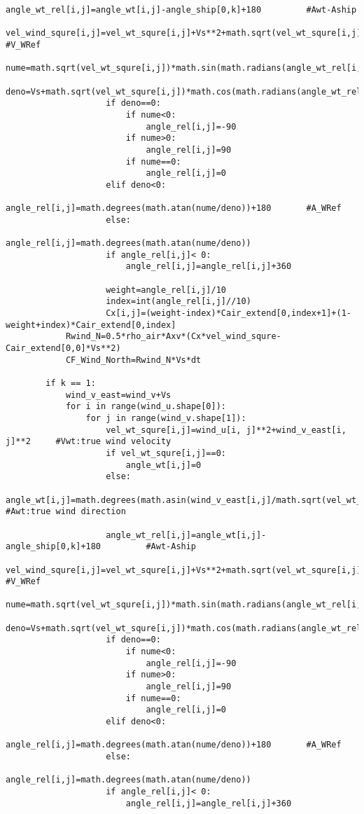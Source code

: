 \begin{lstlisting}[caption=Testing codes (\autoref{TestResults}), label=TestCodes]
                    angle_wt_rel[i,j]=angle_wt[i,j]-angle_ship[0,k]+180         #Awt-Aship
                    vel_wind_squre[i,j]=vel_wt_squre[i,j]+Vs**2+math.sqrt(vel_wt_squre[i,j])*Vs*math.cos(math.radians(angle_wt_rel[i,j])) #V_WRef
                    nume=math.sqrt(vel_wt_squre[i,j])*math.sin(math.radians(angle_wt_rel[i,j]))
                    deno=Vs+math.sqrt(vel_wt_squre[i,j])*math.cos(math.radians(angle_wt_rel[i,j]))
                    if deno==0:
                        if nume<0:
                            angle_rel[i,j]=-90
                        if nume>0:
                            angle_rel[i,j]=90
                        if nume==0:
                            angle_rel[i,j]=0
                    elif deno<0:
                        angle_rel[i,j]=math.degrees(math.atan(nume/deno))+180       #A_WRef
                    else:
                        angle_rel[i,j]=math.degrees(math.atan(nume/deno))
                    if angle_rel[i,j]< 0:
                        angle_rel[i,j]=angle_rel[i,j]+360
                    
                    weight=angle_rel[i,j]/10
                    index=int(angle_rel[i,j]//10)
                    Cx[i,j]=(weight-index)*Cair_extend[0,index+1]+(1-weight+index)*Cair_extend[0,index]
            Rwind_N=0.5*rho_air*Axv*(Cx*vel_wind_squre-Cair_extend[0,0]*Vs**2)
            CF_Wind_North=Rwind_N*Vs*dt

        if k == 1:
            wind_v_east=wind_v+Vs
            for i in range(wind_u.shape[0]):
                for j in range(wind_v.shape[1]):
                    vel_wt_squre[i,j]=wind_u[i, j]**2+wind_v_east[i, j]**2     #Vwt:true wind velocity
                    if vel_wt_squre[i,j]==0:
                        angle_wt[i,j]=0
                    else:
                        angle_wt[i,j]=math.degrees(math.asin(wind_v_east[i,j]/math.sqrt(vel_wt_squre[i,j]))) #Awt:true wind direction
                    
                    angle_wt_rel[i,j]=angle_wt[i,j]-angle_ship[0,k]+180         #Awt-Aship
                    vel_wind_squre[i,j]=vel_wt_squre[i,j]+Vs**2+math.sqrt(vel_wt_squre[i,j])*Vs*math.cos(math.radians(angle_wt_rel[i,j])) #V_WRef
                    nume=math.sqrt(vel_wt_squre[i,j])*math.sin(math.radians(angle_wt_rel[i,j]))
                    deno=Vs+math.sqrt(vel_wt_squre[i,j])*math.cos(math.radians(angle_wt_rel[i,j]))
                    if deno==0:
                        if nume<0:
                            angle_rel[i,j]=-90
                        if nume>0:
                            angle_rel[i,j]=90
                        if nume==0:
                            angle_rel[i,j]=0
                    elif deno<0:
                        angle_rel[i,j]=math.degrees(math.atan(nume/deno))+180       #A_WRef
                    else:
                        angle_rel[i,j]=math.degrees(math.atan(nume/deno))
                    if angle_rel[i,j]< 0:
                        angle_rel[i,j]=angle_rel[i,j]+360
                    

\end{lstlisting}
